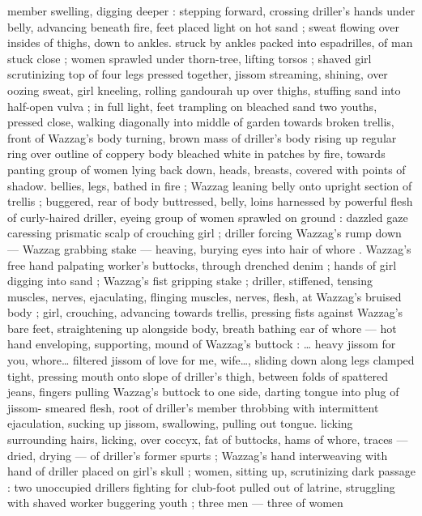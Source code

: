 member swelling, digging deeper : stepping forward, crossing 
driller's hands under belly, advancing beneath fire, feet placed light 
on hot sand ; sweat flowing over insides of thighs, down to ankles. 
struck by ankles packed into espadrilles, of man stuck close ; women 
sprawled under thorn-tree, lifting torsos ; shaved girl scrutinizing top 
of four legs pressed together, jissom streaming, shining, over oozing 
sweat, girl kneeling, rolling gandourah up over thighs, stuffing sand 
into half-open vulva ; in full light, feet trampling on bleached sand 
two youths, pressed close, walking diagonally into middle of garden 
towards broken trellis, front of Wazzag's body turning, brown mass 
of driller's body rising up regular ring over outline of coppery body 
bleached white in patches by fire, towards panting group of women 
lying back down, heads, breasts, covered with points of shadow. 
bellies, legs, bathed in fire ; Wazzag leaning belly onto upright 
section of trellis ; buggered, rear of body buttressed, belly, loins 
harnessed by powerful flesh of curly-haired driller, eyeing group of 
women sprawled on ground : dazzled gaze caressing prismatic scalp 
of crouching girl ; driller forcing Wazzag's rump down --- Wazzag 
grabbing stake --- heaving, burying eyes into hair of whore . 
Wazzag's free hand palpating worker's buttocks, through drenched 
denim ; hands of girl digging into sand ; Wazzag's fist gripping stake 
; driller, stiffened, tensing muscles, nerves, ejaculating, flinging 
muscles, nerves, flesh, at Wazzag's bruised body ; girl, crouching, 
advancing towards trellis, pressing fists against Wazzag's bare feet, 
straightening up alongside body, breath bathing ear of whore --- hot 
hand enveloping, supporting, mound of Wazzag's buttock : {\gl}{\ldots} heavy 
jissom for you, whore{\ldots} filtered jissom of love for me, wife{\ldots}{\gr}, sliding 
down along legs clamped tight, pressing mouth onto slope of 
driller's thigh, between folds of spattered jeans, fingers pulling 
Wazzag's buttock to one side, darting tongue into plug of jissom- 
smeared flesh, root of driller's member throbbing with intermittent 
ejaculation, sucking up jissom, swallowing, pulling out tongue. licking 
surrounding hairs, licking, over coccyx, fat of buttocks, hams of 
whore, traces --- dried, drying --- of driller's former spurts ; 
Wazzag's hand interweaving with hand of driller placed on girl's skull 
; women, sitting up, scrutinizing dark passage : two unoccupied 
drillers fighting for club-foot pulled out of latrine, struggling with 
shaved worker buggering youth ; three men --- three of women 
